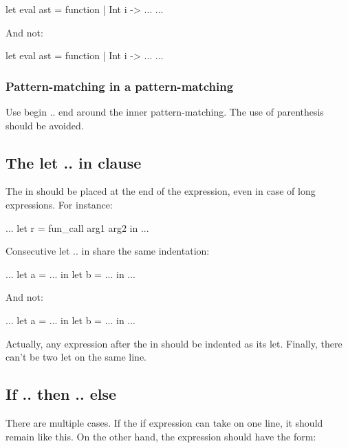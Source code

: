 \documentclass[12pt,a4paper]{article}
\begin{document}
\begin{OCaml}
let eval ast = function
  | Int i -> ...
...
\end{OCaml}

And not:


\begin{OCaml}
let eval ast = function
               | Int i -> ...
...
\end{OCaml}

\subsubsection*{Pattern-matching in a pattern-matching}

\medskip

Use \textsf{begin .. end} around the inner pattern-matching. The use of
parenthesis should be avoided.

\subsection*{The \textsf{let .. in} clause}

The \textsf{in} should be placed at the end of the expression, even in case of
long expressions. For instance:

\begin{OCaml}
...
let r = fun_call
  arg1
  arg2 in
...
\end{OCaml}

Consecutive \textsf{let .. in} share the same indentation:

\begin{OCaml}
...
let a = ... in
let b = ... in
...
\end{OCaml}

And not:

\begin{OCaml}
...
let a = ... in
  let b = ... in
    ...
\end{OCaml}

Actually, any expression after the \textsf{in} should be indented as its
\textsf{let}. Finally, there can't be two \textsf{let} on the same line.


\subsection*{\textsf{If .. then .. else}}

There are multiple cases. If the \textsf{if} expression can take on one line, it
should remain like this. On the other hand, the expression should have the form:
\end{document}
